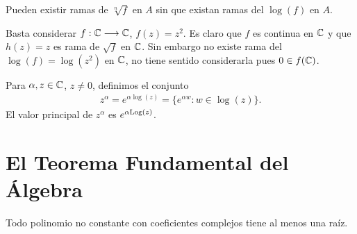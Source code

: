 \begin{obs}
    Pueden existir ramas de $\sqrt[n]{f}$ en $A$ sin que existan ramas del $\log(f)$ en $A$.

    Basta considerar $f: \mathbb{C} \longrightarrow \mathbb{C}$, $f(z) = z^2$. Es claro que $f$ es continua en $\mathbb{C}$ y que $h(z) = z$ es rama de $\sqrt{f}$ en $\mathbb{C}$. Sin embargo no existe rama del $\log(f) = \log(z^2)$ en $\mathbb{C}$, no tiene sentido considerarla pues $0 \in f(\mathbb{C})$.
\end{obs}

\begin{defi}
    Para $\alpha, z \in \mathbb{C}$, $z \not = 0$, definimos el conjunto
    \begin{align*}
        z^{\alpha} = e^{\alpha \log(z)} = \{e^{\alpha w} : w \in \log(z) \}.
    \end{align*}
    El valor principal de $z^{\alpha}$ es $e^{\alpha \text{Log}(z)}$.
\end{defi}

\section{El Teorema Fundamental del Álgebra}

\begin{teo}
    Todo polinomio no constante con coeficientes complejos tiene al menos una raíz.
\end{teo}

